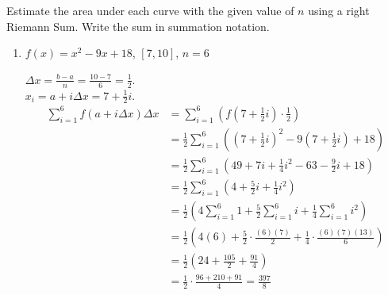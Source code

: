 \documentclass[nooutcomes,handout]{ximera}
\begin{document}
\begin{problem}
Estimate the area under each curve with the given value of $n$ using a right Riemann Sum. Write the sum in summation notation.
	\begin{enumerate}
	\item  $f(x) = x^2 - 9x + 18$, \; $[7,10]$, \; $n=6$
		\begin{freeResponse}
		$\Delta x=\frac{b-a}{n}=\frac{10-7}{6}=\frac{1}{2}.$  \\
		$x_i =a+i\Delta x=7+\frac{1}{2}i.$  
		\begin{align*}
		\sum_{i=1}^{6} f(a + i \Delta x) \Delta x &= \sum_{i=1}^{6} \left( f \left( 7 + \frac{1}{2} i \right) \cdot \frac{1}{2} \right)  \\
		&= \frac{1}{2} \sum_{i=1}^{6} \left( \left( 7 + \frac{1}{2} i \right)^2 - 9 \left( 7 + \frac{1}{2} i \right) + 18 \right) \\
		&= \frac{1}{2} \sum_{i=1}^{6} \left( 49 + 7i + \frac{1}{4} i^2 - 63 - \frac{9}{2} i + 18 \right) \\
		&= \frac{1}{2} \sum_{i=1}^{6} \left( 4 + \frac{5}{2} i + \frac{1}{4} i^2 \right) \\
		&= \frac{1}{2} \left( 4 \sum_{i=1}^{6} 1 + \frac{5}{2} \sum_{i=1}^{6} i + \frac{1}{4} \sum_{i=1}^{6} i^2 \right) \\
		&= \frac{1}{2} \left( 4(6) + \frac{5}{2} \cdot \frac{(6)(7)}{2} + \frac{1}{4} \cdot \frac{(6)(7)(13)}{6} \right) \\
		&= \frac{1}{2} \left( 24 + \frac{105}{2} + \frac{91}{4} \right) \\
		&= \frac{1}{2} \cdot \frac{96 + 210 + 91}{4} = \frac{397}{8}
		\end{align*}
		\end{freeResponse}
		
		
		

\end{enumerate}
\end{problem}
\end{document}
